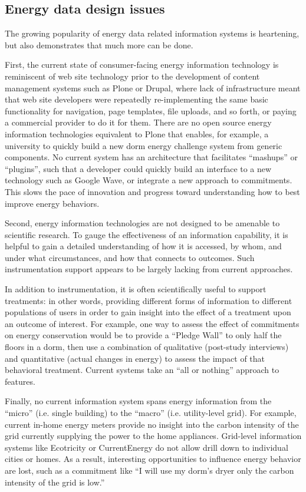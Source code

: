 \subsection{Energy data design issues}

The growing popularity of energy data related information systems is
heartening, but also demonstrates that much more can be done. 

First, the current state of consumer-facing energy information technology
is reminiscent of web site technology prior to the development of content
management systems such as Plone or Drupal, where lack of infrastructure
meant that web site developers were repeatedly re-implementing the same
basic functionality for navigation, page templates, file uploads, and so
forth, or paying a commercial provider to do it for them.  There are no
open source energy information technologies equivalent to Plone that
enables, for example, a university to quickly build a new dorm energy
challenge system from generic components.  No current system has an
architecture that facilitates ``mashups'' or ``plugins'', such that a
developer could quickly build an interface to a new technology such as
Google Wave, or integrate a new approach to commitments. This slows the
pace of innovation and progress toward understanding how to best improve
energy behaviors.

Second, energy information technologies are not designed to be amenable to
scientific research.  To gauge the effectiveness of an information
capability, it is helpful to gain a detailed understanding of how it is
accessed, by whom, and under what circumstances, and how that connects
to outcomes.  Such instrumentation support appears to be largely lacking
from current approaches.

In addition to instrumentation, it is often scientifically useful to
support treatments: in other words, providing different forms of
information to different populations of users in order to gain insight into
the effect of a treatment upon an outcome of interest. For example, one way
to assess the effect of commitments on energy conservation would be to
provide a ``Pledge Wall'' to only half the floors in a dorm, then use a
combination of qualitative (post-study interviews) and quantitative (actual
changes in energy) to assess the impact of that behavioral
treatment. Current systems take an ``all or nothing'' approach to
features. 

Finally, no current information system spans energy information from the ``micro''
(i.e. single building) to the ``macro'' (i.e. utility-level grid).  For
example, current in-home energy meters provide no insight into the carbon
intensity of the grid currently supplying the power to the home appliances.
Grid-level information systems like Ecotricity or CurrentEnergy do not
allow drill down to individual cities or homes.  As a result, interesting
opportunities to influence energy behavior are lost, such as a commitment
like ``I will use my dorm's dryer only the carbon intensity of the grid is low.''

